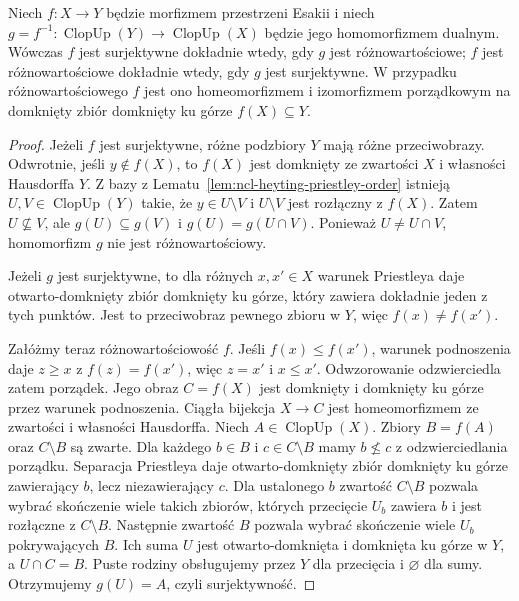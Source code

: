 \begin{twierdzenie}
\label{thm:ncl-heyting-esakia-inj-surj}
Niech $f:X\to Y$ będzie morfizmem przestrzeni Esakii
i niech $g=f^{-1}:\operatorname{ClopUp}(Y)
\to\operatorname{ClopUp}(X)$ będzie jego homomorfizmem
dualnym. Wówczas $f$ jest surjektywne dokładnie wtedy,
gdy $g$ jest różnowartościowe; $f$ jest różnowartościowe
dokładnie wtedy, gdy $g$ jest surjektywne.
W przypadku różnowartościowego $f$ jest ono
homeomorfizmem i izomorfizmem porządkowym
na domknięty zbiór domknięty ku górze $f(X)\subseteq Y$.
\end{twierdzenie}
\begin{proof}
Jeżeli $f$ jest surjektywne, różne podzbiory $Y$
mają różne przeciwobrazy. Odwrotnie, jeśli
$y\notin f(X)$, to $f(X)$ jest domknięty ze zwartości
$X$ i własności Hausdorffa $Y$.
Z bazy z Lematu~\ref{lem:ncl-heyting-priestley-order}
istnieją $U,V\in\operatorname{ClopUp}(Y)$ takie,
że $y\in U\setminus V$ i $U\setminus V$ jest
rozłączny z $f(X)$. Zatem $U\not\subseteq V$,
ale $g(U)\subseteq g(V)$ i
$g(U)=g(U\cap V)$. Ponieważ $U\ne U\cap V$,
homomorfizm $g$ nie jest różnowartościowy.

Jeżeli $g$ jest surjektywne, to dla różnych
$x,x'\in X$ warunek Priestleya daje
otwarto-domknięty zbiór domknięty ku górze,
który zawiera dokładnie jeden z tych punktów.
Jest to przeciwobraz pewnego zbioru w $Y$,
więc $f(x)\ne f(x')$.

Załóżmy teraz różnowartościowość $f$.
Jeśli $f(x)\leq f(x')$, warunek podnoszenia
daje $z\geq x$ z $f(z)=f(x')$, więc
$z=x'$ i $x\leq x'$. Odwzorowanie odzwierciedla
zatem porządek. Jego obraz $C=f(X)$ jest domknięty
i domknięty ku górze przez warunek podnoszenia.
Ciągła bijekcja $X\to C$ jest homeomorfizmem
ze zwartości i własności Hausdorffa.
Niech $A\in\operatorname{ClopUp}(X)$.
Zbiory $B=f(A)$ oraz $C\setminus B$ są zwarte.
Dla każdego $b\in B$ i $c\in C\setminus B$
mamy $b\not\leq c$ z odzwierciedlania porządku.
Separacja Priestleya daje otwarto-domknięty
zbiór domknięty ku górze zawierający $b$,
lecz niezawierający $c$.
Dla ustalonego $b$ zwartość $C\setminus B$
pozwala wybrać skończenie wiele takich zbiorów,
których przecięcie $U_b$ zawiera $b$ i jest
rozłączne z $C\setminus B$. Następnie zwartość
$B$ pozwala wybrać skończenie wiele $U_b$
pokrywających $B$. Ich suma $U$ jest
otwarto-domknięta i domknięta ku górze w $Y$,
a $U\cap C=B$. Puste rodziny obsługujemy przez
$Y$ dla przecięcia i $\varnothing$ dla sumy.
Otrzymujemy $g(U)=A$, czyli surjektywność.
\end{proof}

